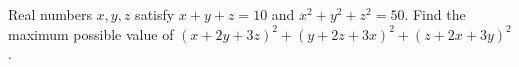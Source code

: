 Real numbers $x,y,z$ satisfy $x+y+z=10$ and $x^2+y^2+z^2=50$. Find the maximum possible value of $(x+2y+3z)^2+(y+2z+3x)^2+(z+2x+3y)^2$.

